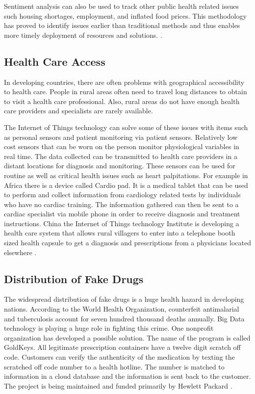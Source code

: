 \documentclass[sigconf]{acmart}
\begin{document}
Sentiment analysis can also be used to track other public health related issues such housing shortages, employment, and inflated food prices.  This methodology has proved to identify issues earlier than traditional methods and thus enables more timely deployment of resources and solutions. \cite{www-google-GloPls}. 

\subsection{Health Care Access}
In developing countries, there are often problems with geographical accessibility to health care. People in rural areas often need to travel long distances to obtain to visit a health care professional. Also, rural areas do not have enough health care providers and specialists are rarely available. 

The Internet of Things technology can solve some of these issues with items such as personal sensors and patient monitoring via patient sensors. Relatively low cost sensors that can be worn on the person monitor physiological variables in real time.  The data collected can be transmitted to health care providers in a distant locations for diagnosis and monitoring. These sensors can be used for routine as well as critical health issues such as heart palpitations. For example in Africa there is a device called Cardio pad. It is a medical tablet that can be used to perform and collect information from cardiology related tests by individuals who have no cardiac training. The information gathered can then be sent to a cardiac specialist via mobile phone in order to receive diagnosis and treatment instructions. China the Internet of Things technology Institute is developing a health care system that allows rural villagers to enter into a telephone booth sized health capsule to get a diagnosis and prescriptions from a physicians located elsewhere \cite{DevEcon}. 

\subsection{Distribution of Fake Drugs}
The widespread distribution of fake drugs is a huge health hazard in developing nations. According to the World Health Organization, counterfeit antimalarial and tuberculosis account for seven hundred thousand deaths annually. Big Data technology is playing a huge role in fighting this crime. One nonprofit organization has developed a possible solution. The name of the program is called GoldKeys. All legitimate prescription containers have a twelve digit scratch off code. Customers can verify the authenticity of the medication by texting the scratched off code number to a health hotline.  The number is matched to information in a cloud database and the information is sent back to the customer. The project is being maintained and funded primarily by Hewlett Packard \cite{DevEcon}. 
\end{document}

